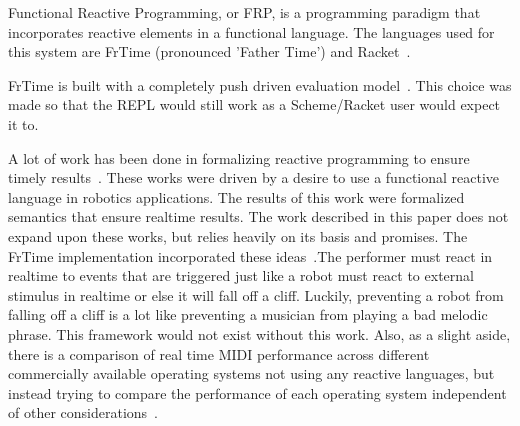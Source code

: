 \documentclass[12pt]{ucthesis}
\begin{document}

Functional Reactive Programming, or FRP, is a programming paradigm that incorporates reactive elements in a functional language. The languages used for this system are FrTime (pronounced 'Father Time') and Racket~\cite{FrTime}.

FrTime is built with a completely push driven evaluation model~\cite{FrTime}. This choice was made so that the REPL would still work as a Scheme/Racket user would expect it to.

A lot of work has been done in formalizing reactive programming to ensure timely results~\cite{EventDriven}\cite{RealTime}. These works were driven by a desire to use a functional reactive language in robotics applications. The results of this work were formalized semantics that ensure realtime results. The work described in this paper does not expand upon these works, but relies heavily on its basis and promises. The FrTime implementation incorporated these ideas~\cite{FrTime}.The performer must react in realtime to events that are triggered just like a robot must react to external stimulus in realtime or else it will fall off a cliff. Luckily, preventing a robot from falling off a cliff is a lot like preventing a musician from playing a bad melodic phrase. This framework would not exist without this work. Also, as a slight aside, there is a comparison of real time MIDI performance across different commercially available operating systems not using any reactive languages, but instead trying to compare the performance of each operating system independent of other considerations~\cite{real-time-midi}.
\end{document}
